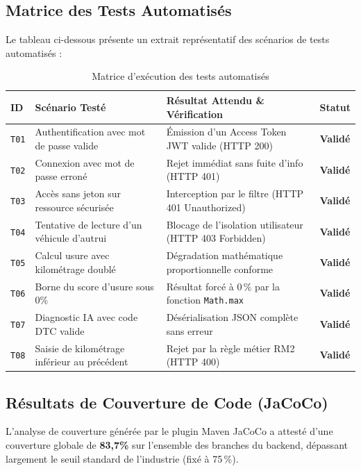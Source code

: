 \documentclass[12pt,a4paper,oneside]{report}
\begin{document}
\subsection{Matrice des Tests Automatis\'es}
Le tableau ci-dessous pr\'esente un extrait repr\'esentatif des sc\'enarios de tests automatis\'es :

\begin{table}[H]
\centering
\small
\begin{tabularx}{\textwidth}{p{1.2cm} p{4.2cm} X p{1.6cm}}
\toprule
\textbf{ID} & \textbf{Sc\'enario Test\'e} & \textbf{R\'esultat Attendu \& V\'erification} & \textbf{Statut} \\
\midrule
\texttt{T01} & Authentification avec mot de passe valide & \'Emission d'un Access Token JWT valide (HTTP 200) & \textcolor{green!50!black}{\textbf{Valid\'e}} \\
\texttt{T02} & Connexion avec mot de passe erron\'e & Rejet imm\'ediat sans fuite d'info (HTTP 401) & \textcolor{green!50!black}{\textbf{Valid\'e}} \\
\texttt{T03} & Acc\`es sans jeton sur ressource s\'ecuris\'ee & Interception par le filtre (HTTP 401 Unauthorized) & \textcolor{green!50!black}{\textbf{Valid\'e}} \\
\texttt{T04} & Tentative de lecture d'un v\'ehicule d'autrui & Blocage de l'isolation utilisateur (HTTP 403 Forbidden) & \textcolor{green!50!black}{\textbf{Valid\'e}} \\
\texttt{T05} & Calcul usure avec kilom\'etrage doubl\'e & D\'egradation math\'ematique proportionnelle conforme & \textcolor{green!50!black}{\textbf{Valid\'e}} \\
\texttt{T06} & Borne du score d'usure sous 0\% & R\'esultat forc\'e \`a $0\,\%$ par la fonction \texttt{Math.max} & \textcolor{green!50!black}{\textbf{Valid\'e}} \\
\texttt{T07} & Diagnostic IA avec code DTC valide & D\'es\'erialisation JSON compl\`ete sans erreur & \textcolor{green!50!black}{\textbf{Valid\'e}} \\
\texttt{T08} & Saisie de kilom\'etrage inf\'erieur au pr\'ec\'edent & Rejet par la r\`egle m\'etier RM2 (HTTP 400) & \textcolor{green!50!black}{\textbf{Valid\'e}} \\
\bottomrule
\end{tabularx}
\caption{Matrice d'ex\'ecution des tests automatis\'es}
\label{tab:tests_matrix}
\end{table}

\subsection{R\'esultats de Couverture de Code (JaCoCo)}
L'analyse de couverture g\'en\'er\'ee par le plugin Maven JaCoCo a attest\'e d'une couverture globale de \textbf{83,7\%} sur l'ensemble des branches du backend, d\'epassant largement le seuil standard de l'industrie (fix\'e \`a 75\,\%).
\end{document}
